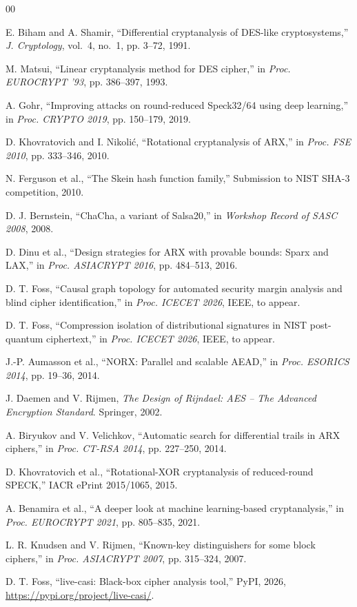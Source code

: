 \documentclass[conference,a4paper]{IEEEtran}
\begin{document}
\begin{thebibliography}{00}

 E. Biham and A. Shamir, ``Differential cryptanalysis of DES-like cryptosystems,'' \textit{J. Cryptology}, vol.~4, no.~1, pp. 3--72, 1991.

 M. Matsui, ``Linear cryptanalysis method for DES cipher,'' in \textit{Proc. EUROCRYPT '93}, pp. 386--397, 1993.

 A. Gohr, ``Improving attacks on round-reduced Speck32/64 using deep learning,'' in \textit{Proc. CRYPTO 2019}, pp. 150--179, 2019.

 D. Khovratovich and I. Nikolić, ``Rotational cryptanalysis of ARX,'' in \textit{Proc. FSE 2010}, pp. 333--346, 2010.

 N. Ferguson et al., ``The Skein hash function family,'' Submission to NIST SHA-3 competition, 2010.

 D. J. Bernstein, ``ChaCha, a variant of Salsa20,'' in \textit{Workshop Record of SASC 2008}, 2008.

 D. Dinu et al., ``Design strategies for ARX with provable bounds: Sparx and LAX,'' in \textit{Proc. ASIACRYPT 2016}, pp. 484--513, 2016.

 D. T. Foss, ``Causal graph topology for automated security margin analysis and blind cipher identification,'' in \textit{Proc. ICECET 2026}, IEEE, to appear.

 D. T. Foss, ``Compression isolation of distributional signatures in NIST post-quantum ciphertext,'' in \textit{Proc. ICECET 2026}, IEEE, to appear.

 J.-P. Aumasson et al., ``NORX: Parallel and scalable AEAD,'' in \textit{Proc. ESORICS 2014}, pp. 19--36, 2014.

 J. Daemen and V. Rijmen, \textit{The Design of Rijndael: AES -- The Advanced Encryption Standard}. Springer, 2002.

 A. Biryukov and V. Velichkov, ``Automatic search for differential trails in ARX ciphers,'' in \textit{Proc. CT-RSA 2014}, pp. 227--250, 2014.

 D. Khovratovich et al., ``Rotational-XOR cryptanalysis of reduced-round SPECK,'' IACR ePrint 2015/1065, 2015.

 A. Benamira et al., ``A deeper look at machine learning-based cryptanalysis,'' in \textit{Proc. EUROCRYPT 2021}, pp. 805--835, 2021.

 L. R. Knudsen and V. Rijmen, ``Known-key distinguishers for some block ciphers,'' in \textit{Proc. ASIACRYPT 2007}, pp. 315--324, 2007.

 D. T. Foss, ``live-casi: Black-box cipher analysis tool,'' PyPI, 2026, \url{https://pypi.org/project/live-casi/}.

\end{thebibliography}
\end{document}
